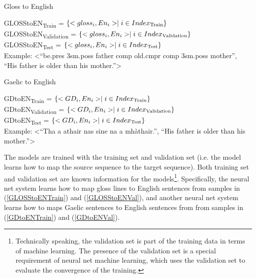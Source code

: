 \documentclass[final]{ua-thesis}
\numberwithin{equation}{section}
\begin{document}
\begin{exe}
	\ex Gloss to English
		\begin{xlist}
		\ex \label{GLOSStoENTrain} GLOSStoEN\textsubscript{Train}   = $\{<gloss_i,En_i>  \mid i \in Index\textsubscript{Train} \}$ \\
		\ex \label{GLOSStoENVal} GLOSStoEN\textsubscript{Validation}   = $\{<gloss_i,En_i>  \mid i \in Index\textsubscript{Validation} \}$ \\
		\ex \label{GLOSStoENTest}GLOSStoEN\textsubscript{Test} = $\{<gloss_i,En_i>  \mid i \in Index\textsubscript{Test} \}$ \\
		\ex  Example: <``be.pres 3sm.poss father comp old.cmpr comp 3sm.poss mother'', ``His father is older than his mother.''>
		\end{xlist}

	
	\ex Gaelic to English
		\begin{xlist}
		\ex \label{GDtoENTrain} GDtoEN\textsubscript{Train}   = $\{<GD_i,En_i>  \mid i \in Index\textsubscript{Train} \}$ \\
		\ex \label{GDtoENVal} GDtoEN\textsubscript{Validation}   = $\{<GD_i,En_i>  \mid i \in Index\textsubscript{Validation} \}$ \\
		\ex \label{GDtoENTest} GDtoEN\textsubscript{Test}    = $\{<GD_i,En_i>  \mid i \in Index\textsubscript{Test} \}$ \\
		\ex Example: <``Tha a athair nas sine na a mh\`athair.'', ``His father is older than his mother.''>
		\end{xlist}
\end{exe}
The models are trained with the training set and validation set (i.e. the model learns how to map the source sequence to the target sequence). Both training set and validation set are known information for the models\footnote{Technically speaking, the validation set is part of the training data in terms of machine learning. The presence of the validation set is a special requirement of neural net machine learning, which uses the validation set to evaluate the convergence of the training.}. Specifically, the neural net system learns how to map gloss lines to English sentences from samples in (\ref{GLOSStoENTrain}) and (\ref{GLOSStoENVal}), and another neural net system learns how to maps Gaelic sentences to English sentences from from samples in (\ref{GDtoENTrain}) and (\ref{GDtoENVal}).
\end{document}
